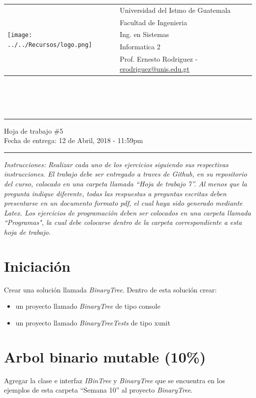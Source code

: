 \documentclass{article}
\newcommand{\horrule}[1]{\rule{\linewidth}{#1}}
\begin{document}
\begin{tabular}{l l}
\multirow{5}{*}{\texttt{[image: ../../Recursos/logo.png]}} & Universidad del Istmo de Guatemala \\
 & Facultad de Ingenieria \\
 & Ing. en Sistemas \\
 & Informatica 2 \\
 & Prof. Ernesto Rodriguez - \href{mailto:erodriguez@unis.edu.gt}{erodriguez@unis.edu.gt} \\
\end{tabular}
\\\\\\

\begin{center}
        \horrule{0.5pt}
        \huge{Hoja de trabajo \#5} \\
        \large{Fecha de entrega: 12 de Abril, 2018 - 11:59pm} \\
        \horrule{1pt}
\end{center}
\emph{Instrucciones: Realizar cada uno de los ejercicios siguiendo sus respectivas
instrucciones. El trabajo debe ser entregado a traves de Github, en su repositorio del curso, colocado en una carpeta llamada ``Hoja de trabajo 7''.
Al menos que la pregunta indique diferente, todas las respuestas a preguntas escritas deben presentarse en
un documento formato pdf, el cual haya sido generado mediante Latex. Los ejercicios de programaci\'on deben ser colocados en una carpeta
llamada ``Programas", la cual debe colocarse dentro de la carpeta correspondiente a esta hoja de trabajo.}

\section*{Iniciaci\'on}

Crear una soluci\'on llamada \emph{BinaryTree}. Dentro de esta soluci\'on crear:
\begin{itemize}
        \item{un proyecto llamado \emph{BinaryTree} de tipo console}
        \item{un proyecto llamado \emph{BinaryTreeTests} de tipo xunit}
\end{itemize}

\section*{Arbol binario mutable (10\%)}
Agregar la clase e interfaz \emph{IBinTree} y \emph{BinaryTree} que se encuentra en los ejemplos
de esta carpeta ``Semana 10'' al proyecto \emph{BinaryTree}.
\end{document}
